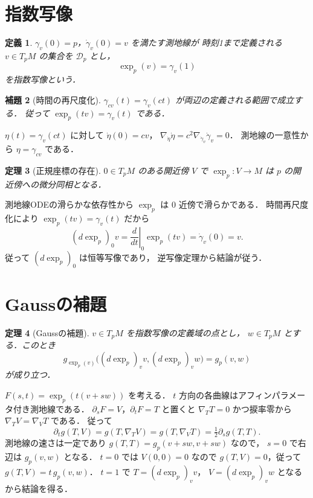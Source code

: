 \documentclass[a5paper,10pt,onecolumn]{jsarticle}
\makeatletter
\theoremstyle{mathnotetheorem}
\newtheorem{theorem}{定理}[section]
\newtheorem{definition}[theorem]{定義}
\newtheorem{lemma}[theorem]{補題}
\renewcommand{\proofname}{証明}
\renewenvironment{proof}[1][\proofname]{%
  \par\pushQED{\qed}\normalfont\topsep4\p@\@plus2\p@\relax
  \trivlist\item[\hskip\labelsep\bfseries #1]\ignorespaces
}{\popQED\endtrivlist\@endpefalse}
\makeatother
\begin{document}
\section{指数写像}
\begin{definition}
$\gamma_v(0)=p$，$\dot\gamma_v(0)=v$ を満たす測地線が
時刻1まで定義される $v\in T_pM$ の集合を $\mathcal D_p$ とし，
\[
 \exp_p(v)=\gamma_v(1)
\]
を指数写像という．
\end{definition}
\begin{lemma}[時間の再尺度化]
$\gamma_{cv}(t)=\gamma_v(ct)$ が両辺の定義される範囲で成立する．
従って $\exp_p(tv)=\gamma_v(t)$ である．
\end{lemma}
\begin{proof}
$\eta(t)=\gamma_v(ct)$ に対して
$\dot\eta(0)=cv$，
$\nabla_{\dot\eta}\dot\eta=c^2
\nabla_{\dot\gamma_v}\dot\gamma_v=0$．
測地線の一意性から $\eta=\gamma_{cv}$ である．
\end{proof}
\begin{theorem}[正規座標の存在]\label{thm:normal}
$0\in T_pM$ のある開近傍 $V$ で
$\exp_p:V\to M$ は $p$ の開近傍への微分同相となる．
\end{theorem}
\begin{proof}
測地線ODEの滑らかな依存性から
$\exp_p$ は $0$ 近傍で滑らかである．
時間再尺度化により
$\exp_p(tv)=\gamma_v(t)$ だから
\[
 (d\exp_p)_0v=
 \left.\frac d{dt}\right|_0\exp_p(tv)
 =\dot\gamma_v(0)=v.
\]
従って $(d\exp_p)_0$ は恒等写像であり，
逆写像定理から結論が従う．
\end{proof}
\section{Gaussの補題}
\begin{theorem}[Gaussの補題]\label{thm:gauss}
$v\in T_pM$ を指数写像の定義域の点とし，
$w\in T_pM$ とする．このとき
\[
 g_{\exp_p(v)}
 \bigl((d\exp_p)_v v,(d\exp_p)_v w\bigr)
 =g_p(v,w)
\]
が成り立つ．
\end{theorem}
\begin{proof}
$F(s,t)=\exp_p(t(v+sw))$ を考える．
$t$ 方向の各曲線はアフィンパラメータ付き測地線である．
$\partial_sF=V$，$\partial_tF=T$ と置くと
$\nabla_TT=0$ かつ捩率零から
$\nabla_TV=\nabla_VT$ である．
従って
\[
 \partial_t g(T,V)
 =g(T,\nabla_TV)
 =g(T,\nabla_VT)
 =\tfrac12\partial_sg(T,T).
\]
測地線の速さは一定であり
$g(T,T)=g_p(v+sw,v+sw)$ なので，
$s=0$ で右辺は $g_p(v,w)$ となる．
$t=0$ では $V(0,0)=0$ なので
$g(T,V)=0$，従って
$g(T,V)=t\,g_p(v,w)$．
$t=1$ で $T=(d\exp_p)_v v$，
$V=(d\exp_p)_v w$ となるから結論を得る．
\end{proof}
\end{document}

